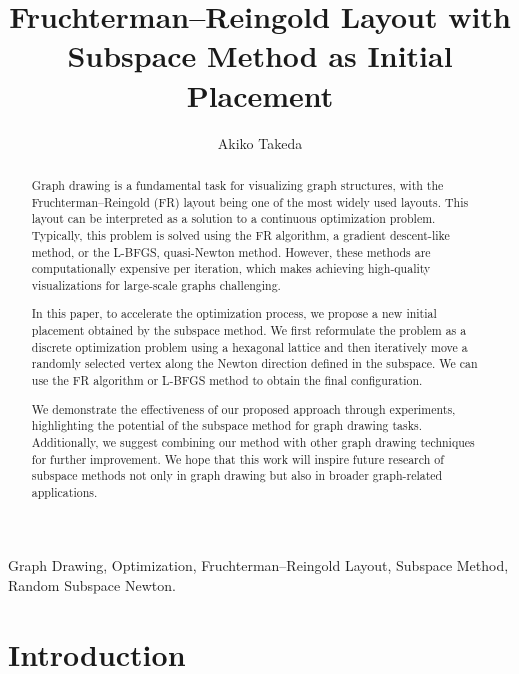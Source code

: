 \documentclass[dvipdfmx,journal]{IEEEtran}
\begin{document}

\title{Fruchterman--Reingold Layout with\\Subspace Method as Initial Placement}
\author{
  Akiko Takeda
}
\maketitle

\begin{abstract}
  Graph drawing is a fundamental task for visualizing graph structures, with the Fruchterman--Reingold (FR) layout being one of the most widely used layouts.
  This layout can be interpreted as a solution to a continuous optimization problem.
  Typically, this problem is solved using the FR algorithm, a gradient descent-like method, or the L-BFGS, quasi-Newton method.
  However, these methods are computationally expensive per iteration, which makes achieving high-quality visualizations for large-scale graphs challenging.

  In this paper, to accelerate the optimization process, we propose a new initial placement obtained by the subspace method.
  We first reformulate the problem as a discrete optimization problem using a hexagonal lattice
  and then iteratively move a randomly selected vertex along the Newton direction defined in the subspace.
  We can use the FR algorithm or L-BFGS method to obtain the final configuration.

  We demonstrate the effectiveness of our proposed approach through experiments, highlighting the potential of the subspace method for graph drawing tasks.
  Additionally, we suggest combining our method with other graph drawing techniques for further improvement.
  We hope that this work will inspire future research of subspace methods not only in graph drawing but also in broader graph-related applications.
\end{abstract}

\begin{IEEEkeywords}
  Graph Drawing, Optimization, Fruchterman--Reingold Layout, Subspace Method, Random Subspace Newton.
\end{IEEEkeywords}

\section{Introduction}\label{sec:introduction}
\end{document}
